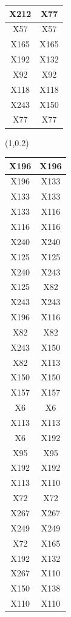 \documentclass{beamer}
\newcommand{\boz}{\cellcolor{pathwaynode}}
\begin{document}
\begin{frame}[plain]
\begin{textblock*}{\paperwidth}
\begin{tabular}{| c c |}
X212   &  X77  \\ \hline
X57   &  X57  \\ \hline
X165   &  X165  \\ \hline
X192   &  X132  \\ \hline
X92   &  X92  \\ \hline
X118   &  X118  \\ \hline
\boz X243   &  \boz X150  \\ \hline
X77   &  X77  \\ \hline
    \end{tabular}
    \hspace{.5em}
  \end{textblock*}
  \begin{textblock*}{\paperwidth}(1\textwidth,0.2\textheight)
    \raggedright 
    \tiny
    \begin{tabular}{| c c |}
      \hline
\boz X196   &  \boz X196  \\ \hline
\boz X196   &  \boz X133  \\ \hline
\boz X133   &  \boz X133  \\ \hline
\boz X133   &  \boz X116  \\ \hline
\boz X116   &  \boz X116  \\ \hline
\boz X240   &  \boz X240  \\ \hline
\boz X125   &  \boz X125  \\ \hline
\boz X240   &  \boz X243  \\ \hline
\boz X125   &  \boz X82  \\ \hline
\boz X243   &  \boz X243  \\ \hline
\boz X196   &  \boz X116  \\ \hline
\boz X82   &  \boz X82  \\ \hline
\boz X243   &  \boz X150  \\ \hline
\boz X82   &  \boz X113  \\ \hline
\boz X150   &  \boz X150  \\ \hline
X157   &  X157  \\ \hline
X6   &  X6  \\ \hline
\boz X113   &  \boz X113  \\ \hline
X6   &  X192  \\ \hline
X95   &  X95  \\ \hline
X192   &  X192  \\ \hline
\boz X113   &  X110  \\ \hline
X72   &  X72  \\ \hline
X267   &  X267  \\ \hline
X249   &  X249  \\ \hline
X72   &  X165  \\ \hline
X192   &  X132  \\ \hline
X267   &  X110  \\ \hline
\boz X150   &  X138  \\ \hline
X110   &  X110  \\ \hline
    \end{tabular}
    \hspace{.5em}
  \end{textblock*}
\end{frame}
\end{document}
